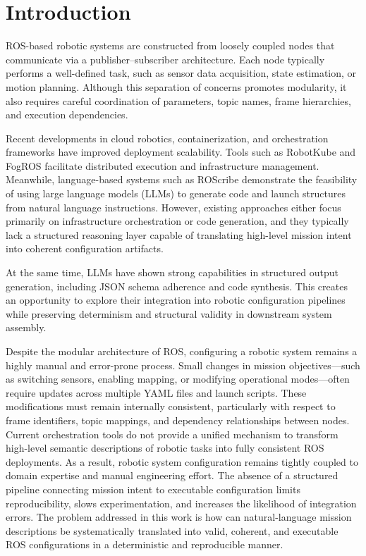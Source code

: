 \chapter{Introduction}\pagestyle{fancy}
ROS-based robotic systems are constructed from loosely coupled nodes that communicate via a publisher–subscriber architecture. Each node typically performs a well-defined task, such as sensor data acquisition, state estimation, or motion planning. Although this separation of concerns promotes modularity, it also requires careful coordination of parameters, topic names, frame hierarchies, and execution dependencies.

Recent developments in cloud robotics, containerization, and orchestration frameworks have improved deployment scalability. Tools such as RobotKube \cite{lampe2023robotkube} and FogROS \cite{fogros22023} facilitate distributed execution and infrastructure management. Meanwhile, language-based systems such as ROScribe \cite{roscribe} demonstrate the feasibility of using large language models (LLMs) to generate code and launch structures from natural language instructions. However, existing approaches either focus primarily on infrastructure orchestration or code generation, and they typically lack a structured reasoning layer capable of translating high-level mission intent into coherent configuration artifacts.

At the same time, LLMs have shown strong capabilities in structured output generation, including JSON schema adherence and code synthesis. This creates an opportunity to explore their integration into robotic configuration pipelines while preserving determinism and structural validity in downstream system assembly.

Despite the modular architecture of ROS, configuring a robotic system remains a highly manual and error-prone process. Small changes in mission objectives—such as switching sensors, enabling mapping, or modifying operational modes—often require updates across multiple YAML files and launch scripts. These modifications must remain internally consistent, particularly with respect to frame identifiers, topic mappings, and dependency relationships between nodes.
Current orchestration tools do not provide a unified mechanism to transform high-level semantic descriptions of robotic tasks into fully consistent ROS deployments. As a result, robotic system configuration 
remains tightly coupled to domain expertise and manual engineering 
effort. The absence of a structured pipeline connecting mission intent
to executable configuration limits reproducibility, slows 
experimentation, and increases the likelihood of integration errors. The problem addressed in this work is how can natural-language mission
descriptions be systematically translated into valid, coherent, and executable
ROS configurations in a deterministic and reproducible manner.